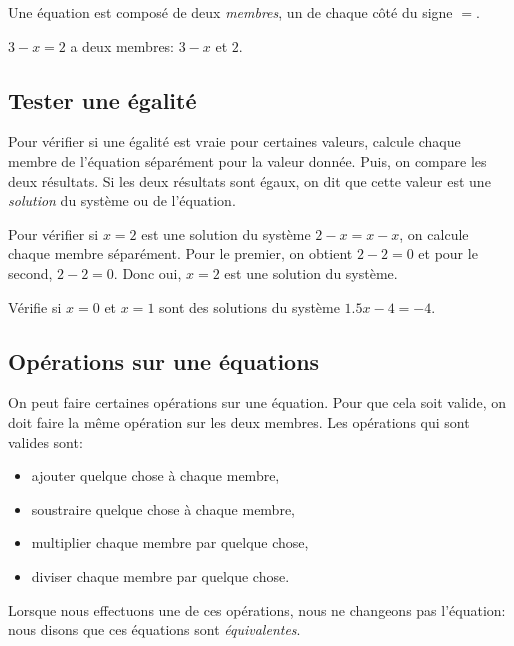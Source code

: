 \begin{definitionfr}
    Une équation est composé de deux \emph{membres}, un de chaque côté du signe $=$.
\end{definitionfr}
\begin{exemple}
    $3-x=2$ a deux membres: $3-x$ et $2$.
\end{exemple}

\subsection{Tester une égalité}

Pour vérifier si une égalité est vraie pour certaines valeurs, calcule chaque membre de l'équation séparément pour la valeur donnée. Puis, on compare les deux résultats. Si les deux résultats sont égaux, on dit que cette valeur est une \emph{solution} du système ou de l'équation.

\begin{exemple}
    Pour vérifier si $x=2$ est une solution du système $2 - x = x - x$, on calcule chaque membre séparément. Pour le premier, on obtient $2 - 2 = 0$ et pour le second, $2 - 2 = 0$. Donc oui, $x = 2$ est une solution du système.
\end{exemple}

\begin{exercicefr}
    Vérifie si $x = 0$ et $x = 1$ sont des solutions du système $1.5x - 4 = -4$.
\end{exercicefr}

\subsection{Opérations sur une équations}

On peut faire certaines opérations sur une équation. Pour que cela soit valide, on doit faire la même opération sur les deux membres. Les opérations qui sont valides sont:
\begin{itemize}
    \item ajouter quelque chose à chaque membre,
    \item soustraire quelque chose à chaque membre,
    \item multiplier chaque membre par quelque chose,
    \item diviser chaque membre par quelque chose.
\end{itemize}

Lorsque nous effectuons une de ces opérations, nous ne changeons pas l'équation: nous disons que ces équations sont \emph{équivalentes}.


